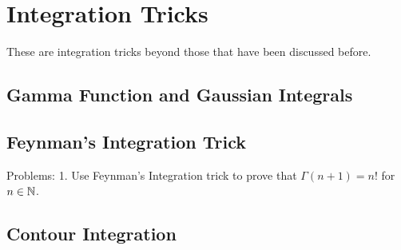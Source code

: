 \chapter{Integration Tricks}\label{ch:integrals}
These are integration tricks beyond those that have been discussed before.
\section{Gamma Function and Gaussian Integrals}
\section{Feynman's Integration Trick}
Problems:
1. Use Feynman's Integration trick to prove that \(\Gamma(n+1)=n!\) for \(n\in\mathbb{N}\).
\section{Contour Integration}
